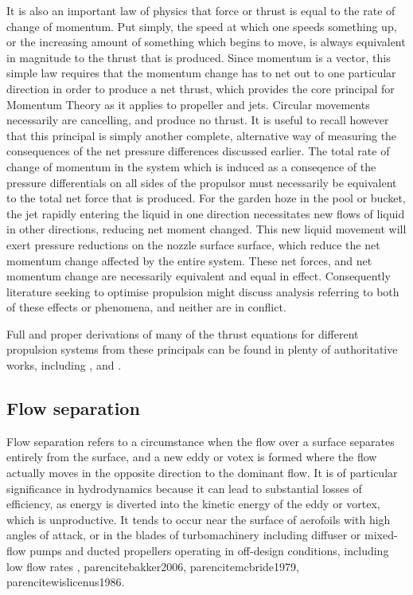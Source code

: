 \documentclass{article}\usepackage[]{graphicx}\usepackage[]{color}
\begin{document}
It is also an important law of physics that force or thrust is equal to the rate of change of momentum. Put simply, the speed at which one speeds something up, or the increasing amount of something which begins to move, is always equivalent in magnitude to the thrust that is produced.  Since momentum is a vector, this simple law requires that the momentum change has to net out to one particular direction in order to produce a net thrust, which provides the core principal for Momentum Theory as it applies to propeller and jets.  Circular movements necessarily are cancelling, and produce no thrust. It is useful to recall however that this principal is simply another complete, alternative way of measuring the consequences of the net pressure differences discussed earlier.  The total rate of change of momentum in the system which is induced as a conseqence of the pressure differentials on all sides of the propulsor must necessarily be equivalent to the total net force that is produced.  For the garden hoze in the pool or bucket, the jet rapidly entering the liquid in one direction necessitates new flows of liquid in other directions, reducing net moment changed. This new liquid movement will exert pressure reductions on the nozzle surface surface, which reduce the net momentum change affected by the entire system.  These net forces, and net momentum change are necessarily equivalent and equal in effect.  Consequently literature seeking to optimise propulsion might discuss analysis referring to both of these effects or phenomena, and neither are in conflict.

Full and proper derivations of many of the thrust equations for different propulsion systems from these principals can be found in plenty of authoritative works, including \cite{lewis1988}, \cite{carlton2007} and \cite{mollard2011}.

\subsection{Flow separation}
Flow separation refers to a circumstance when the flow over a surface separates entirely from the surface, and a new eddy or votex is formed where the flow actually moves in the opposite direction to the dominant flow.  It is of particular significance in hydrodynamics because it can lead to substantial losses of efficiency, as energy is diverted into the kinetic energy of the eddy or vortex, which is unproductive. It tends to occur near the surface of aerofoils with high angles of attack, or in the blades of turbomachinery including diffuser or mixed-flow pumps and ducted propellers operating in off-design conditions, including low flow rates \parencite{li2013}, parencite{bakker2006}, parencite{mcbride1979}, parencite{wislicenus1986}.
\end{document}
